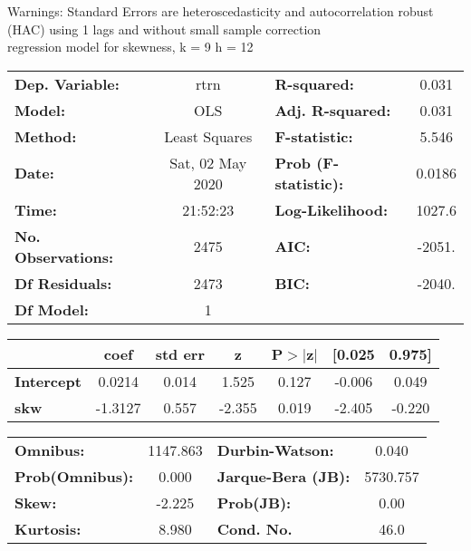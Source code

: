 Warnings: \newline
 [1] Standard Errors are heteroscedasticity and autocorrelation robust (HAC) using 1 lags and without small sample correction\\ 

regression model for skewness, k = 9 h = 12\begin{center}
\begin{tabular}{lclc}
\toprule
\textbf{Dep. Variable:}    &       rtrn       & \textbf{  R-squared:         } &     0.031   \\
\textbf{Model:}            &       OLS        & \textbf{  Adj. R-squared:    } &     0.031   \\
\textbf{Method:}           &  Least Squares   & \textbf{  F-statistic:       } &     5.546   \\
\textbf{Date:}             & Sat, 02 May 2020 & \textbf{  Prob (F-statistic):} &   0.0186    \\
\textbf{Time:}             &     21:52:23     & \textbf{  Log-Likelihood:    } &    1027.6   \\
\textbf{No. Observations:} &        2475      & \textbf{  AIC:               } &    -2051.   \\
\textbf{Df Residuals:}     &        2473      & \textbf{  BIC:               } &    -2040.   \\
\textbf{Df Model:}         &           1      & \textbf{                     } &             \\
\bottomrule
\end{tabular}
\begin{tabular}{lcccccc}
                   & \textbf{coef} & \textbf{std err} & \textbf{z} & \textbf{P$> |$z$|$} & \textbf{[0.025} & \textbf{0.975]}  \\
\midrule
\textbf{Intercept} &       0.0214  &        0.014     &     1.525  &         0.127        &       -0.006    &        0.049     \\
\textbf{skw}       &      -1.3127  &        0.557     &    -2.355  &         0.019        &       -2.405    &       -0.220     \\
\bottomrule
\end{tabular}
\begin{tabular}{lclc}
\textbf{Omnibus:}       & 1147.863 & \textbf{  Durbin-Watson:     } &    0.040  \\
\textbf{Prob(Omnibus):} &   0.000  & \textbf{  Jarque-Bera (JB):  } & 5730.757  \\
\textbf{Skew:}          &  -2.225  & \textbf{  Prob(JB):          } &     0.00  \\
\textbf{Kurtosis:}      &   8.980  & \textbf{  Cond. No.          } &     46.0  \\
\bottomrule
\end{tabular}
\end{center}

